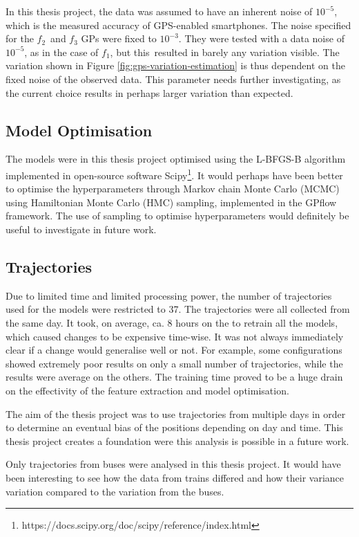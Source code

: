In this thesis project, the data was assumed to have an inherent noise of $10^{-5}$, which is the measured accuracy of GPS-enabled smartphones.
The noise specified for the $f_2$ and $f_3$ GPs were fixed to $10^{-3}$.
They were tested with a data noise of $10^{-5}$, as in the case of $f_1$, but this resulted in barely any variation visible.
The variation shown in Figure \ref{fig:gps-variation-estimation} is thus dependent on the fixed noise of the observed data.
This parameter needs further investigating, as the current choice results in perhaps larger variation than expected.

\subsection{Model Optimisation}
The models were in this thesis project optimised using the L-BFGS-B algorithm implemented in open-source software Scipy\footnote{https://docs.scipy.org/doc/scipy/reference/index.html}.
It would perhaps have been better to optimise the hyperparameters through Markov chain Monte Carlo (MCMC) using Hamiltonian Monte Carlo (HMC) sampling, implemented in the GPflow framework.
The use of sampling to optimise hyperparameters would definitely be useful to investigate in future work.

\subsection{Trajectories}
Due to limited time and limited processing power, the number of trajectories used for the models were restricted to 37.
The trajectories were all collected from the same day.
It took, on average, ca. 8 hours on the to retrain all the models, which caused changes to be expensive time-wise.
It was not always immediately clear if a change would generalise well or not.
For example, some configurations showed extremely poor results on only a small number of trajectories, while the results were average on the others.
The training time proved to be a huge drain on the effectivity of the feature extraction and model optimisation.

The aim of the thesis project was to use trajectories from multiple days in order to determine an eventual bias of the positions depending on day and time.
This thesis project creates a foundation were this analysis is possible in a future work.   

Only trajectories from buses were analysed in this thesis project.
It would have been interesting to see how the data from trains differed and how their variance variation compared to the variation from the buses.

